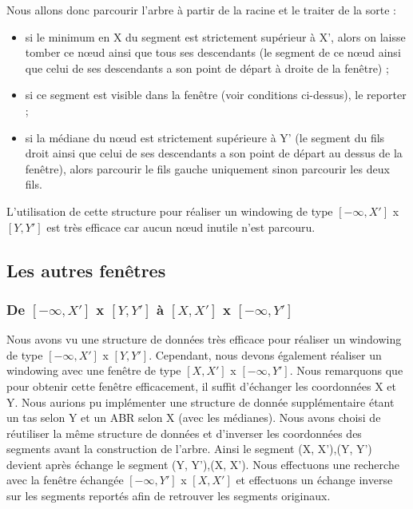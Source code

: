 \documentclass[10pt,a4paper]{article}
\begin{document}
Nous allons donc parcourir l'arbre à partir de la racine et le traiter de la sorte :
\begin{itemize}
	\item si le minimum en X du segment est strictement supérieur à X', alors on laisse tomber ce nœud ainsi que tous ses descendants (le segment de ce nœud ainsi que celui de ses descendants a son point de départ à droite de la fenêtre) ;
	\item si ce segment est visible dans la fenêtre (voir conditions ci-dessus), le reporter ;
	\item si la médiane du nœud est strictement supérieure à Y' (le segment du fils droit ainsi que celui de ses descendants a son point de départ au dessus de la fenêtre), alors parcourir le fils gauche uniquement sinon parcourir les deux fils.
\end{itemize}

L'utilisation de cette structure pour réaliser un windowing de type $[-\infty, X']$ x $[Y, Y']$ est très efficace car aucun nœud inutile n'est parcouru.


\subsection{Les autres fenêtres}
\subsubsection{De $[-\infty, X']$ x $[Y, Y']$ à $[X, X']$ x $[-\infty, Y']$}
Nous avons vu une structure de données très efficace pour réaliser un windowing de type $[-\infty, X']$ x $[Y, Y']$. Cependant, nous devons également réaliser un windowing avec une fenêtre de type $[X, X']$ x $[-\infty, Y']$. Nous remarquons que pour obtenir cette fenêtre efficacement, il suffit d'échanger les coordonnées X et Y. Nous aurions pu implémenter une structure de donnée supplémentaire étant un tas selon Y et un ABR selon X (avec les médianes). Nous avons choisi de réutiliser la même structure de données et d'inverser les coordonnées des segments avant la construction de l'arbre. Ainsi le segment (X, X'),(Y, Y') devient après échange le segment (Y, Y'),(X, X'). Nous effectuons une recherche avec la fenêtre échangée $[-\infty, Y']$ x $[X, X']$ et effectuons un échange inverse sur les segments reportés afin de retrouver les segments originaux.
\end{document}
